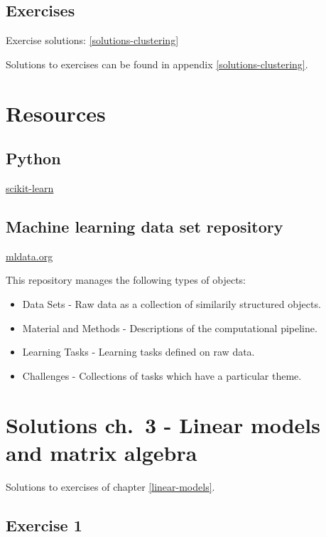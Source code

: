 \documentclass[]{book}
\providecommand{\tightlist}{%
  \setlength{\itemsep}{0pt}\setlength{\parskip}{0pt}}
\theoremstyle{definition}
\theoremstyle{definition}
\theoremstyle{definition}
\theoremstyle{remark}
\begin{document}
\section{Exercises}\label{exercises-7}

Exercise solutions: \ref{solutions-clustering}

Solutions to exercises can be found in appendix
\ref{solutions-clustering}.

\appendix


\chapter{Resources}\label{resources}

\section{Python}\label{python}

\href{http://scikit-learn.org}{scikit-learn}

\section{Machine learning data set
repository}\label{machine-learning-data-set-repository}

\href{http://mldata.org/}{mldata.org}

This repository manages the following types of objects:

\begin{itemize}
\tightlist
\item
  Data Sets - Raw data as a collection of similarily structured objects.
\item
  Material and Methods - Descriptions of the computational pipeline.
\item
  Learning Tasks - Learning tasks defined on raw data.
\item
  Challenges - Collections of tasks which have a particular theme.
\end{itemize}

\chapter{Solutions ch.~3 - Linear models and matrix
algebra}\label{solutions-linear-models}

Solutions to exercises of chapter \ref{linear-models}.

\section{Exercise 1}\label{exercise-1}
\end{document}
